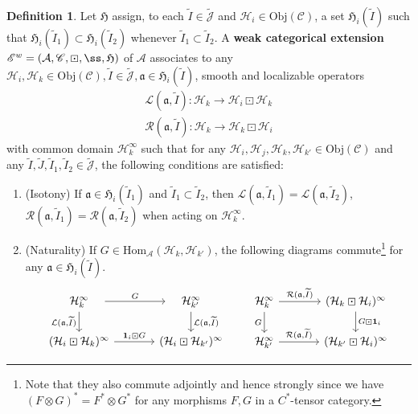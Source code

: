 \documentclass[11pt,b5paper,notitlepage]{article}
\theoremstyle{definition}
\newtheorem{df}{Definition}[section]
\theoremstyle{plain}
\newcommand{\fk}{\mathfrak}
\newcommand{\mc}{\mathcal}
\newcommand{\wtd}{\widetilde}
\newcommand{\idt}{\mathbf{1}}
\newcommand{\Hom}{\mathrm{Hom}}
\newcommand{\scr}{\mathscr}
\newcommand{\Jtd}{\widetilde{\mathcal J}}
\newcommand{\Obj}{\mathrm{Obj}}
\numberwithin{equation}{section}
\begin{document}
\begin{df}\label{lb8}
Let $\fk H$ assign, to each $\wtd I\in\Jtd$ and $\mc H_i\in\Obj(\scr C)$, a set $\fk H_i(\wtd I)$  such that $\fk H_i(\wtd I_1)\subset\fk H_i(\wtd I_2)$  whenever $\wtd I_1\subset\wtd I_2$. A \textbf{weak categorical extension} $\scr E^w=(\mc A,\scr C,\boxdot,\ss,\fk H)$ of $\mc A$ associates to any $\mc H_i,\mc H_k\in\Obj(\scr C),\wtd I\in\Jtd,\fk a\in\fk H_i(\wtd I)$, smooth and localizable operators
\begin{gather*}	
\mc L(\fk a,\wtd I):\mc H_k\rightarrow\mc H_i\boxdot\mc H_k\\
\mc R(\fk a,\wtd I):\mc H_k\rightarrow\mc H_k\boxdot\mc H_i
\end{gather*}
with common domain $\mc H_k^\infty$ such that for any $\mc H_i,\mc H_j,\mc H_k,\mc H_{k'}\in\Obj(\scr C)$ and any $\wtd I,\wtd J,\wtd I_1,\wtd I_2\in\Jtd$, the following conditions are satisfied:
\begin{enumerate}[label=(\alph*)]
\item 	(Isotony) If  $\fk a\in\fk H_i(\wtd I_1)$ and $\wtd I_1\subset\wtd I_2$, then $\mc L(\fk a,\wtd I_1)=\mc L(\fk a,\wtd I_2)$, $\mc R(\fk a,\wtd I_1)=\mc R(\fk a,\wtd I_2)$ when acting on $\mc H_k^\infty$.
	
\item (Naturality) If  $G\in\Hom_{\mc A}(\mc H_k,\mc H_{k'})$,  the following diagrams commute\footnote{Note that they also commute adjointly and hence strongly since we have $(F\otimes G)^*=F^*\otimes G^*$ for any morphisms $F,G$ in a $C^*$-tensor category.}   for any $\fk a\in\fk H_i(\wtd I)$.
\begin{equation*}
\begin{tikzcd}[column sep=large]
\quad\mc H_k^\infty\quad \arrow[d,"{\mc L(\fk a,\wtd I)}"'] \arrow[r,"G"] & \quad\mc H_{k'}^\infty\quad \arrow[d,"{\mc L(\fk a,\wtd I)}"] \\
(\mc H_i\boxdot\mc H_k)^\infty \arrow[r,"\idt_i\boxdot G"]           & (\mc H_i\boxdot\mc H_{k'})^\infty          
\end{tikzcd}
\qquad
\begin{tikzcd}[column sep=large]
\mc H_k^\infty \arrow[r,"{\mc R(\fk a,\wtd I)}"] \arrow[d,"G"'] & (\mc H_k\boxdot\mc H_i)^\infty \arrow[d,"G\boxdot\idt_i"] \\
\mc H_{k'}^\infty \arrow[r,"{\mc R(\fk a,\wtd I)}"]           & (\mc H_{k'}\boxdot\mc H_i)^\infty        
\end{tikzcd}
\end{equation*}
	

\end{enumerate}
\end{df}
\end{document}
